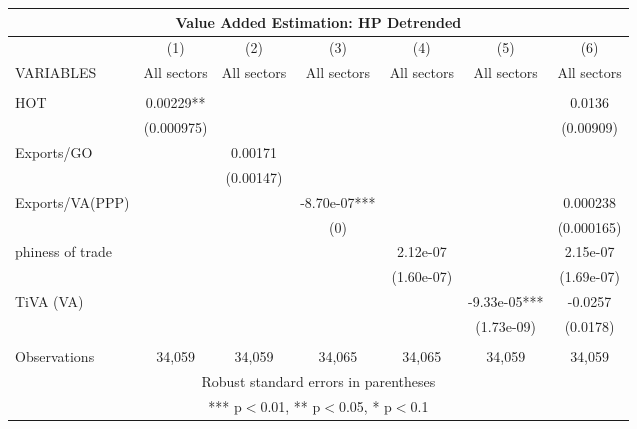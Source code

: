 \documentclass[]{article}
\begin{document}
\begin{tabular}{lcccccc}
\multicolumn{7}{c}{Value Added Estimation: HP Detrended} \\ \hline
 & (1) & (2) & (3) & (4) & (5) & (6) \\
VARIABLES & All sectors & All sectors & All sectors & All sectors & All sectors & All sectors \\ \hline
 &  &  &  &  &  &  \\
HOT & 0.00229** &  &  &  &  & 0.0136 \\
 & (0.000975) &  &  &  &  & (0.00909) \\
Exports/GO &  & 0.00171 &  &  &  &  \\
 &  & (0.00147) &  &  &  &  \\
Exports/VA(PPP) &  &  & -8.70e-07*** &  &  & 0.000238 \\
 &  &  & (0) &  &  & (0.000165) \\
phiness of trade &  &  &  & 2.12e-07 &  & 2.15e-07 \\
 &  &  &  & (1.60e-07) &  & (1.69e-07) \\
TiVA (VA) &  &  &  &  & -9.33e-05*** & -0.0257 \\
 &  &  &  &  & (1.73e-09) & (0.0178) \\
 &  &  &  &  &  &  \\
 Observations & 34,059 & 34,059 & 34,065 & 34,065 & 34,059 & 34,059 \\ \hline
\multicolumn{7}{c}{ Robust standard errors in parentheses} \\
\multicolumn{7}{c}{ *** p$<$0.01, ** p$<$0.05, * p$<$0.1} \\
\end{tabular}
\end{document}
